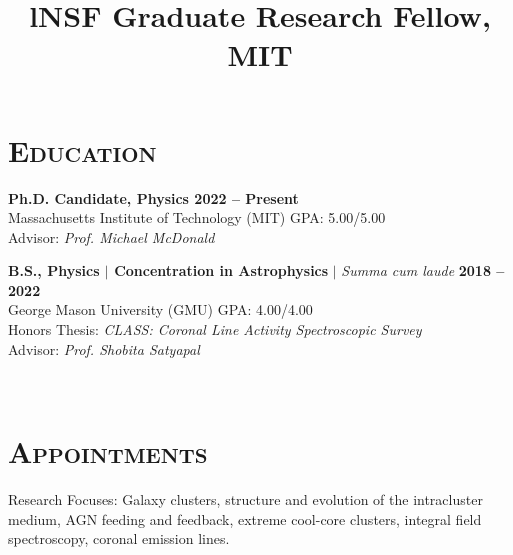 \documentclass[marg, centered]{res}
\begin{document}
\begin{resume}

\section{{\scshape \bfseries Education}}
{\bf Ph.D. Candidate, Physics \hfill 2022 -- Present}\\
{Massachusetts Institute of Technology (MIT)} \hfill GPA: 5.00/5.00 \\
Advisor: {\em Prof. Michael McDonald} \\
\vspace{-0.7cm}

{\bf B.S., Physics $|$ Concentration in Astrophysics} $|$ {\em Summa cum laude} \hfill {\bf 2018 -- 2022} \\
{George Mason University (GMU)} \hfill GPA: 4.00/4.00 \\ 
Honors Thesis: {\em CLASS: Coronal Line Activity Spectroscopic Survey} \\
Advisor: {\em Prof. Shobita Satyapal}


\begin{format}
\title{l}\\
\body
\end{format}

\section{{\scshape \bfseries Appointments}}

\title{\textbf{NSF Graduate Research Fellow}, MIT}
\begin{position}
{\small Research Focuses: Galaxy clusters, structure and evolution of the intracluster medium, AGN feeding and feedback, extreme cool-core clusters, integral field spectroscopy, coronal emission lines.}
\end{position}


\end{resume}
\end{document}
